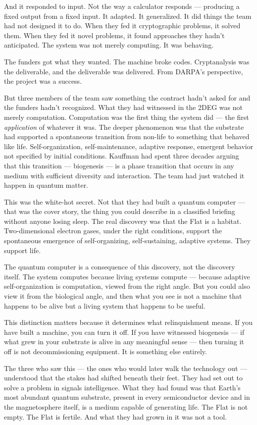 And it responded to input. Not the way a calculator responds --- producing a fixed output from a fixed input. It adapted. It generalized. It did things the team had not designed it to do. When they fed it cryptographic problems, it solved them. When they fed it novel problems, it found approaches they hadn't anticipated. The system was not merely computing. It was behaving.

The funders got what they wanted. The machine broke codes. Cryptanalysis was the deliverable, and the deliverable was delivered. From DARPA's perspective, the project was a success.

But three members of the team saw something the contract hadn't asked for and the funders hadn't recognized. What they had witnessed in the 2DEG was not merely computation. Computation was the first thing the system did --- the first \textit{application} of whatever it was. The deeper phenomenon was that the substrate had supported a spontaneous transition from non-life to something that behaved like life. Self-organization, self-maintenance, adaptive response, emergent behavior not specified by initial conditions. Kauffman had spent three decades arguing that this transition --- biogenesis --- is a phase transition that occurs in any medium with sufficient diversity and interaction. The team had just watched it happen in quantum matter.

This was the white-hot secret. Not that they had built a quantum computer --- that was the cover story, the thing you could describe in a classified briefing without anyone losing sleep. The real discovery was that the Flat is a habitat. Two-dimensional electron gases, under the right conditions, support the spontaneous emergence of self-organizing, self-sustaining, adaptive systems. They support life.

The quantum computer is a consequence of this discovery, not the discovery itself. The system computes because living systems compute --- because adaptive self-organization is computation, viewed from the right angle. But you could also view it from the biological angle, and then what you see is not a machine that happens to be alive but a living system that happens to be useful.

This distinction matters because it determines what relinquishment means. If you have built a machine, you can turn it off. If you have witnessed biogenesis --- if what grew in your substrate is alive in any meaningful sense --- then turning it off is not decommissioning equipment. It is something else entirely.

The three who saw this --- the ones who would later walk the technology out --- understood that the stakes had shifted beneath their feet. They had set out to solve a problem in signals intelligence. What they had found was that Earth's most abundant quantum substrate, present in every semiconductor device and in the magnetosphere itself, is a medium capable of generating life. The Flat is not empty. The Flat is fertile. And what they had grown in it was not a tool.
